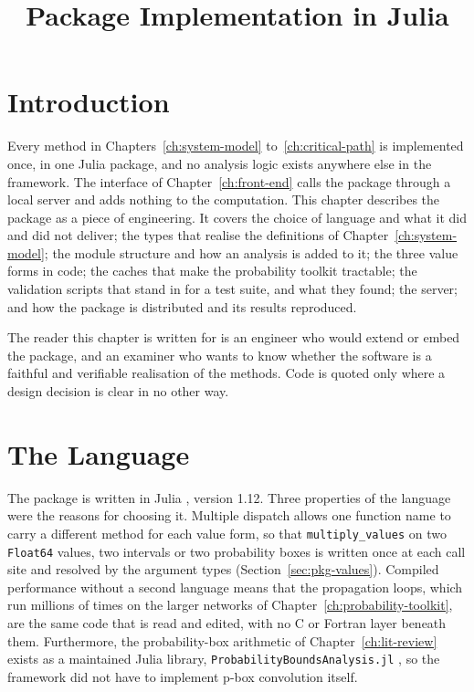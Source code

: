 \documentclass[12pt]{report}
\begin{document}
\title{Package Implementation in Julia}
\fi

\providecommand{\PH}[1]{\textbf{[#1]}}

\section{Introduction}
\label{sec:pkg-intro}

Every method in Chapters~\ref{ch:system-model} to~\ref{ch:critical-path} is implemented once,
in one Julia package, and no analysis logic exists anywhere else in the framework. The
interface of Chapter~\ref{ch:front-end} calls the package through a local server and adds
nothing to the computation. This chapter describes the package as a piece of engineering. It covers the choice of
language and what it did and did not deliver; the types that realise the definitions of
Chapter~\ref{ch:system-model}; the module structure and how an analysis is added to it; the
three value forms in code; the caches that make the probability toolkit tractable; the
validation scripts that stand in for a test suite, and what they found; the server; and how
the package is distributed and its results reproduced.

The reader this chapter is written for is an engineer who would extend or embed the package,
and an examiner who wants to know whether the software is a faithful and verifiable
realisation of the methods. Code is quoted only where a design decision is clear in no
other way.

\section{The Language}
\label{sec:pkg-language}

The package is written in Julia \cite{bezanson2017julia}, version 1.12. Three properties of the language were the reasons for choosing it. Multiple dispatch allows
one function name to carry a different method for each value form, so that
\texttt{multiply\_values} on two \texttt{Float64} values, two intervals or two probability
boxes is written once at each call site and resolved by the argument types
(Section~\ref{sec:pkg-values}). Compiled performance without a second language means that
the propagation loops, which run millions of times on the larger networks of
Chapter~\ref{ch:probability-toolkit}, are the same code that is read and edited, with no
C or Fortran layer beneath them. Furthermore, the probability-box arithmetic of
Chapter~\ref{ch:lit-review} exists as a maintained Julia library,
\texttt{ProbabilityBoundsAnalysis.jl} \cite{gray2021pbajulia}, so the framework did not have
to implement p-box convolution itself.
\end{document}
